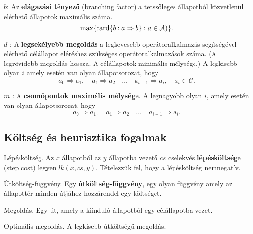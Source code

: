 $b$: Az {\bf elágazási tényező} (branching factor) a tetszőleges
állapotból közvetlenül elérhető állapotok maximális száma. \[
\max \{\operatorname{card} \{b:a \Rightarrow b\} : a \in \mathcal{A})\}
.\]

$d$ : A {\bf legsekélyebb megoldás} a legkevesebb operátoralkalmazás
segítségével elérhető célállapot eléréshez szükséges operátoralkalmazások száma.
(A legrövidebb megoldás hossza. A célállapotok minimális mélysége.)
A legkisebb olyan $i$ amely esetén van olyan állapotsorozat, hogy \[
    a_0 \Rightarrow a_1, \quad a_1 \Rightarrow a_2 \quad \ldots \quad a_{i-1}
    \Rightarrow a_i,\quad a_i \in \mathcal{C}
.\]

$m$ : A {\bf csomópontok maximális mélysége}. A legnagyobb olyan $i$, amely esetén
van olyan állapotsorozat, hogy \[
    a_0 \Rightarrow a_1,\quad a_1 \Rightarrow a_2 \quad \ldots \quad a_{i-1}
    \Rightarrow a_i
.\]


\subsection{Költség és heurisztika fogalmak}

\begin{definicio}
    Lépésköltség.
    Az $x$ állapotból az $y$ állapotba vezető $cs$ cselekvés
    \textbf{lépésköltség}e (step cost) legyen $lk(x, cs, y)$.  Tételezzük fel,
    hogy a lépésköltség nemnegatív.
\end{definicio}

\begin{definicio}
    Útköltség-függvény.
    Egy \textbf{útköltség-függvény}, egy olyan függvény amely az állapottér
    minden útjához hozzárendel egy költséget.
\end{definicio}

\begin{definicio}
    Megoldás.
    Egy út, amely a kiinduló állapotból egy célállapotba vezet.
\end{definicio}

\begin{definicio}
    Optimális megoldás.
    A legkisebb útköltségű megoldás.
\end{definicio}

